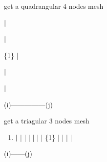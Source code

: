 \documentclass[letterpaper,10pt,english]{sphinxmanual}
\begin{document}
\begin{fulllineitems}
\label{\detokenize{myfempy.mesh:myfempy.mesh.legacy.get_legacy_quad4}}
\pysigstartsignatures
{}
\pysigstopsignatures
\sphinxAtStartPar
get a quadrangular 4 nodes mesh
\begin{description}
\begin{DUlineblock}{0em}
\item[]
\begin{DUlineblock}{\DUlineblockindent}
\item[] {\color{red}\bfseries{}|}
\item[] {\color{red}\bfseries{}|}
\end{DUlineblock}
\item[] \{1\}        |
\item[]
\begin{DUlineblock}{\DUlineblockindent}
\item[] {\color{red}\bfseries{}|}
\item[] {\color{red}\bfseries{}|}
\end{DUlineblock}
\end{DUlineblock}

\end{description}

\sphinxAtStartPar
(i)—————(j)

\end{fulllineitems}


\begin{fulllineitems}
\label{\detokenize{myfempy.mesh:myfempy.mesh.legacy.get_legacy_tria3}}
\pysigstartsignatures
{}
\pysigstopsignatures
\sphinxAtStartPar
get a triagular 3 nodes mesh
\begin{enumerate}
%
\setcounter{enumi}{10}
\item {} 
\sphinxAtStartPar
{\color{red}\bfseries{}|}
| 
|       |        |         |          |  \{1\} 
|            |             |              |          

\end{enumerate}

\sphinxAtStartPar
(i)——\textendash{}(j)

\end{fulllineitems}
\end{document}
